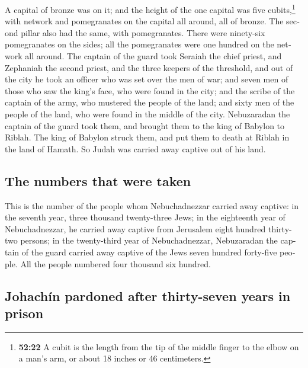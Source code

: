 \begin{paracol}{2}
\begin{otherlanguage}{english}
 A capital of bronze was on it; and the height of the one
capital was five cubits,\footnote{\textbf{52:22} A cubit is the length
  from the tip of the middle finger to the elbow on a man's arm, or
  about 18 inches or 46 centimeters.} with network and pomegranates on
the capital all around, all of bronze. The second pillar also had the
same, with pomegranates.  There were ninety-six
pomegranates on the sides; all the pomegranates were one hundred on the
network all around.  The captain of the guard took
Seraiah the chief priest, and Zephaniah the second priest, and the three
keepers of the threshold,  and out of the city he took an
officer who was set over the men of war; and seven men of those who saw
the king's face, who were found in the city; and the scribe of the
captain of the army, who mustered the people of the land; and sixty men
of the people of the land, who were found in the middle of the city.
 Nebuzaradan the captain of the guard took them, and
brought them to the king of Babylon to Riblah.  The king
of Babylon struck them, and put them to death at Riblah in the land of
Hamath. So Judah was carried away captive out of his land.

\hypertarget{the-numbers-that-were-taken}{%
\subsection{The numbers that were
taken}\label{the-numbers-that-were-taken}}

 This is the number of the people whom Nebuchadnezzar
carried away captive: in the seventh year, three thousand twenty-three
Jews;  in the eighteenth year of Nebuchadnezzar, he
carried away captive from Jerusalem eight hundred thirty-two persons;
 in the twenty-third year of Nebuchadnezzar, Nebuzaradan
the captain of the guard carried away captive of the Jews seven hundred
forty-five people. All the people numbered four thousand six hundred.

\hypertarget{johachuxedn-pardoned-after-thirty-seven-years-in-prison}{%
\subsection{Johachín pardoned after thirty-seven years in
prison}\label{johachuxedn-pardoned-after-thirty-seven-years-in-prison}}


\end{otherlanguage}
\end{paracol}
